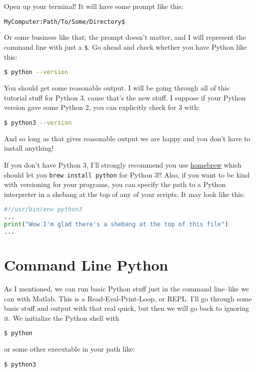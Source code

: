 \documentclass[11pt, twoside, reqno]{book}
\begin{document}
\label{Back to business:}

Open up your terminal! It will have some prompt like this:
\begin{lstlisting}[language=sh]
MyComputer:Path/To/Some/Directory$
\end{lstlisting}

Or some business like that; the prompt doesn't matter, and I will represent the command line with just a \texttt{\$}. Go ahead and check whether you have Python like this:
\begin{lstlisting}[language=sh]
$ python --version
\end{lstlisting}

You should get some reasonable output. I will be going through all of this tutorial stuff for Python 3, cause that's the new stuff. I suppose if your Python version gave some Python 2, you can explicitly check for 3 with:
\begin{lstlisting}[language=sh]
$ python3 --version
\end{lstlisting}

And so long as that gives reasonable output we are happy and you don't have to install anything!

If you don't have Python 3, I'll strongly recommend you use \href{https://brew.sh/}{homebrew} which should let you \texttt{brew install python} for Python 3!! Also, if you want to be kind with versioning for your programs, you can specify the path to a Python interpreter in a shebang at the top of any of your scripts. It may look like this:
\begin{lstlisting}[language=Python]
#!/usr/bin/env python3
...
print("Wow I'm glad there's a shebang at the top of this file")
...
\end{lstlisting}

\section{Command Line Python}

As I mentioned, we can run basic Python stuff just in the command line--like we can with Matlab. This is a Read-Eval-Print-Loop, or REPL. I'll go through some basic stuff and output with that real quick, but then we will go back to ignoring it. We initialize the Python shell with
\begin{lstlisting}[language=sh]
$ python
\end{lstlisting}

or some other executable in your path like:
\begin{lstlisting}[language=sh]
$ python3
\end{lstlisting}
\end{document}
